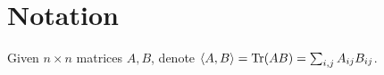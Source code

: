 \section{Notation}

Given $n \times n$ matrices $A,B$, denote $\langle A,B\rangle = \operatorname{Tr}(AB) = \sum_{i,j} A_{ij} B_{ij}$.